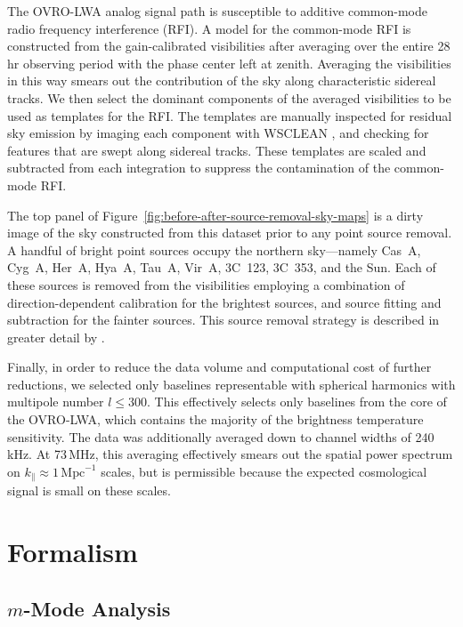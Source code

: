 \begin{bibunit}
The OVRO-LWA analog signal path is susceptible to additive common-mode radio frequency interference
(RFI). A model for the common-mode RFI is constructed from the gain-calibrated visibilities after
averaging over the entire 28\,hr observing period with the phase center left at zenith. Averaging
the visibilities in this way smears out the contribution of the sky along characteristic sidereal
tracks. We then select the dominant components of the averaged visibilities to be used as templates
for the RFI. The templates are manually inspected for residual sky emission by imaging each
component with WSCLEAN \citep{2014MNRAS.444..606O}, and checking for features that are swept along
sidereal tracks. These templates are scaled and subtracted from each integration to suppress the
contamination of the common-mode RFI.

The top panel of Figure~\ref{fig:before-after-source-removal-sky-maps} is a dirty image of the sky
constructed from this dataset prior to any point source removal.  A handful of bright point sources
occupy the northern sky---namely Cas~A, Cyg~A, Her~A, Hya~A, Tau~A, Vir~A, 3C~123, 3C~353, and the
Sun.  Each of these sources is removed from the visibilities employing a combination of
direction-dependent calibration for the brightest sources, and source fitting and subtraction for
the fainter sources. This source removal strategy is described in greater detail by
\citet{2018AJ....156...32E}.

Finally, in order to reduce the data volume and computational cost of further reductions, we
selected only baselines representable with spherical harmonics with multipole number $l \le 300$.
This effectively selects only baselines from the core of the OVRO-LWA, which contains the majority
of the brightness temperature sensitivity. The data was additionally averaged down to channel widths
of 240\,kHz. At 73\,MHz, this averaging effectively smears out the spatial power spectrum on
$k_\parallel \approx 1\,\text{Mpc}^{-1}$ scales, but is permissible because the expected
cosmological signal is small on these scales.

\section{Formalism}\label{sec:formalism}

\subsection{$m$-Mode Analysis}


\end{bibunit}

